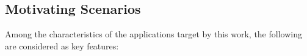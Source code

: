 




\subsection{Motivating Scenarios}\label{sec:motivating}

Among the characteristics of the applications target by this work, the following are considered as key features:

